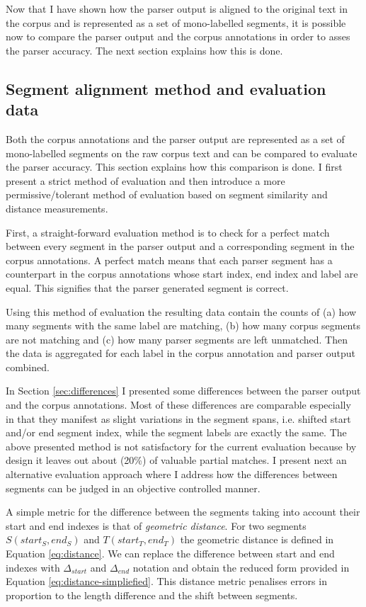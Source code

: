     Now that I have shown how the parser output is aligned to the original text in the corpus and is represented as a set of mono-labelled segments, it is possible now to compare the parser output and the corpus annotations in order to asses the parser accuracy. The next section explains how this is done. 

\subsection{Segment alignment method and evaluation data}
\label{sec:alignment-algorithms}    

    Both the corpus annotations and the parser output are represented as a set of mono-labelled segments on the raw corpus text and can be compared to evaluate the parser accuracy. This section explains how this comparison is done. I first present a strict method of evaluation and then introduce a more permissive/tolerant  method of evaluation based on segment similarity and distance measurements. 

    First, a straight-forward evaluation method is to check for a perfect match between every segment in the parser output and a corresponding segment in the corpus annotations. A perfect match means that each parser segment has a counterpart in the corpus annotations whose start index, end index and label are equal. This signifies that the parser generated segment is correct.
    
    Using this method of evaluation the resulting data contain the counts of (a) how many segments with the same label are matching, (b) how many corpus segments are not matching and (c) how many parser segments are left unmatched. Then the data is aggregated for each label in the corpus annotation and parser output combined. 
    
    In Section \ref{sec:differences} I presented some differences between the parser output and the corpus annotations. Most of these differences are comparable especially in that they manifest as slight variations in the segment spans, i.e. shifted start and/or end segment index, while the segment labels are exactly the same. The above presented method is not satisfactory for the current evaluation because by design it leaves out about (20\%) of valuable partial matches. I present next an alternative evaluation approach where I address how the differences between segments can be judged in an objective controlled manner.
    
    A simple metric for the difference between the segments taking into account their start and end indexes is that of \textit{geometric distance}. For two segments $S(start_S,end_S)$ and $T(start_T,end_T)$ the geometric distance is defined in Equation \ref{eq:distance}. We can replace the difference between start and end indexes with $\varDelta_{start}$ and $\varDelta_{end}$ notation and obtain the reduced form provided in Equation \ref{eq:distance-simpliefied}. This distance metric penalises errors in proportion to the length difference and the shift between segments. 
    
